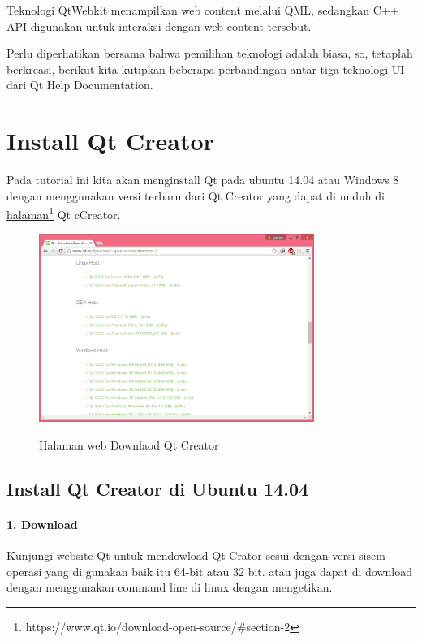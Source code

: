 Teknologi QtWebkit menampilkan web content melalui QML, sedangkan C++
API digunakan untuk interaksi dengan web content tersebut.

Perlu diperhatikan bersama bahwa pemilihan teknologi adalah biasa, so,
tetaplah berkreasi, berikut kita kutipkan beberapa perbandingan antar
tiga teknologi UI dari Qt Help Documentation.

\section{ Install Qt Creator}\label{install-qt-creator}

Pada tutorial ini kita akan menginstall Qt pada ubuntu 14.04 atau
Windows 8 dengan menggunakan versi terbaru dari Qt Creator yang dapat di
unduh di \href{http://www.qt.io/download}{halaman}\footnote{https://www.qt.io/download-open-source/\#section-2} Qt cCreator.

\begin{figure}[htbp]
\centering
\includegraphics[width=0.8\textwidth]{images/qt-downloads.png}
\label{halaman-web-download-qt}
\caption{Halaman web Downlaod Qt Creator}
\end{figure}

\subsection{Install Qt Creator di Ubuntu
14.04}\label{install-qt-creator-di-ubuntu-14.04}

\paragraph{1. Download}\label{download}

Kunjungi website Qt untuk mendowload Qt Crator sesui dengan versi sisem
operasi yang di gunakan baik itu 64-bit atau 32 bit. atau juga dapat di
download dengan menggunakan command line di linux dengan mengetikan.

